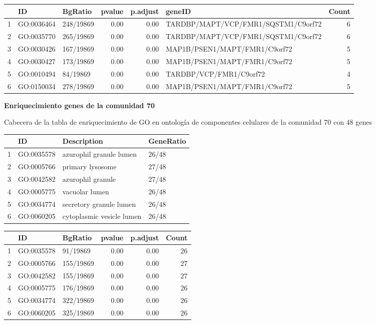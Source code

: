 \begin{table}[ht]
\centering
\begin{tabular}{rllrrlr}
  \hline
 & ID & BgRatio & pvalue & p.adjust & geneID & Count \\ 
  \hline
1 & GO:0036464 & 248/19869 & 0.00 & 0.00 & TARDBP/MAPT/VCP/FMR1/SQSTM1/C9orf72 &   6 \\ 
  2 & GO:0035770 & 265/19869 & 0.00 & 0.00 & TARDBP/MAPT/VCP/FMR1/SQSTM1/C9orf72 &   6 \\ 
  3 & GO:0030426 & 167/19869 & 0.00 & 0.00 & MAP1B/PSEN1/MAPT/FMR1/C9orf72 &   5 \\ 
  4 & GO:0030427 & 173/19869 & 0.00 & 0.00 & MAP1B/PSEN1/MAPT/FMR1/C9orf72 &   5 \\ 
  5 & GO:0010494 & 84/19869 & 0.00 & 0.00 & TARDBP/VCP/FMR1/C9orf72 &   4 \\ 
  6 & GO:0150034 & 278/19869 & 0.00 & 0.00 & MAP1B/PSEN1/MAPT/FMR1/C9orf72 &   5 \\ 
   \hline
\end{tabular}
\end{table}

\newpage

\textbf{Enriquecimiento genes de la comunidad 70}

 Cabecera de la tabla de enriquecimiento de GO en ontología de componentes celulares de la comunidad 70 con 48 genes

\hfill

\begin{table}[ht]
\centering
\begin{tabular}{rlll}
  \hline
 & ID & Description & GeneRatio \\ 
  \hline
1 & GO:0035578 & azurophil granule lumen & 26/48 \\ 
  2 & GO:0005766 & primary lysosome & 27/48 \\ 
  3 & GO:0042582 & azurophil granule & 27/48 \\ 
  4 & GO:0005775 & vacuolar lumen & 26/48 \\ 
  5 & GO:0034774 & secretory granule lumen & 26/48 \\ 
  6 & GO:0060205 & cytoplasmic vesicle lumen & 26/48 \\ 
   \hline
\end{tabular}
\end{table}

\begin{table}[ht]
\centering
\begin{tabular}{rllrrr}
  \hline
 & ID & BgRatio & pvalue & p.adjust & Count \\ 
  \hline
1 & GO:0035578 & 91/19869 & 0.00 & 0.00 &  26 \\ 
  2 & GO:0005766 & 155/19869 & 0.00 & 0.00 &  27 \\ 
  3 & GO:0042582 & 155/19869 & 0.00 & 0.00 &  27 \\ 
  4 & GO:0005775 & 176/19869 & 0.00 & 0.00 &  26 \\ 
  5 & GO:0034774 & 322/19869 & 0.00 & 0.00 &  26 \\ 
  6 & GO:0060205 & 325/19869 & 0.00 & 0.00 &  26 \\ 
   \hline
\end{tabular}
\end{table}


